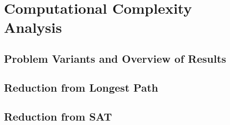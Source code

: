 \chapter{Computational Complexity Analysis}
\label{cha:computational_complexity_analysis}

\section{Problem Variants and Overview of Results}


\section{Reduction from Longest Path}


\section{Reduction from SAT}



